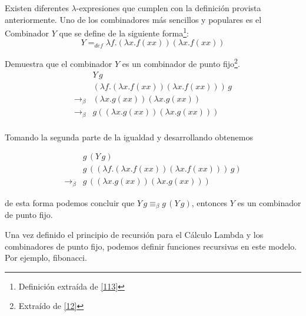               
                    \begin{definition}[Combinador $Y$] Existen diferentes $\lambda$-expresiones que cumplen con la definición provista anteriormente. Uno de los combinadores más sencillos y populares es el Combinador $Y$ que se define de la siguiente forma\footnote{Definición extraída de \hyperlink{113}{[113]}}:
                        $$Y =_{def} \lambda f.(\lambda x.f(xx))(\lambda x.f(xx))$$
                    \end{definition}
    
                    \begin{exercise} Demuestra que el combinador  $Y$ es un combinador de punto fijo\footnote{Extraído de \hyperlink{12}{[12]} }.
                        \[
                            \begin{array}{cl}
                            &Y\,g\\
                            &(\lambda f.(\lambda x.f(xx))(\lambda x.f(xx)))\,g\\
                            \to_\beta&(\lambda x.g(xx))(\lambda x.g(xx))\\
                            \to_\beta&g((\lambda x.g(xx))(\lambda x.g(xx)))\\
                            \end{array}
                        \]
                    
                        Tomando la segunda parte de la igualdad y desarrollando obtenemos
                    
                        \[
                            \begin{array}{cl}
                            &g\,(Y\,g)\\
                            &g\,((\lambda f.(\lambda x.f(xx))(\lambda x.f(xx)))\,g)\\
                            \to_\beta&g\,((\lambda x.g(xx))(\lambda x.g(xx)))
                            \end{array}
                        \]
                    
                        de esta forma podemos concluir que $Y \,g\equiv_\beta g\,(Y\,g)$, entonces $Y$ es un combinador de punto fijo.
                    \end{exercise}

	Una vez definido el principio de recursión para el Cálculo Lambda y los combinadores de punto fijo, podemos definir funciones recursivas en este modelo. Por ejemplo, fibonacci.

